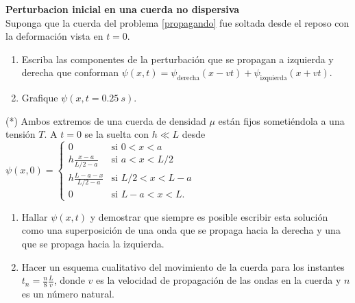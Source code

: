 \item 
\textbf{Perturbacion inicial en una cuerda no dispersiva}\\
Suponga que la cuerda del problema \ref{propagando} fue soltada desde el reposo con la deformación vista en $t=0$.
\begin{enumerate}
	\item Escriba las componentes de la perturbación que se propagan a izquierda y derecha que conforman $\psi(x,t) = \psi_\text{derecha} (x - v t ) + \psi_\text{izquierda} ( x + v t )$.
	\item Grafique $\psi(x, t= \SI{0.25}{s})$.
\end{enumerate}



\item (*) Ambos extremos de una cuerda de densidad $\mu$ están fijos sometiéndola a una tensión $T$.
A $t=0$ se la suelta con $h \ll L$ desde
$
\psi(x,0)=\begin{cases}
0 & \mbox{si }0<x<a\\
h\frac{x-a}{L/2-a} & \mbox{si }a<x<L/2\\
h\frac{L-a-x}{L/2-a} & \mbox{si }L/2<x<L-a\\
0 & \mbox{si }L-a<x<L .
\end{cases}
$
\begin{enumerate}
	\item Hallar $\psi(x,t)$ y demostrar que siempre es posible escribir esta solución como una superposición de una onda que se propaga hacia la derecha y una que se propaga hacia la izquierda.
	\item Hacer un esquema cualitativo del movimiento de la cuerda para los instantes $t_n = \frac{n}{8} \frac{L}{v}$, donde $v$ es la velocidad de propagación de las ondas en la cuerda y $n$ es un número natural.
\end{enumerate}


